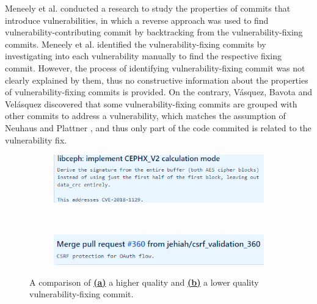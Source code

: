 \documentclass[12pt, a4paper]{report}
\begin{document}
Meneely et al. \cite{meneely_2013} conducted a research to study the properties of commits that
introduce vulnerabilities, in which a reverse approach was used to find vulnerability-contributing
commit by backtracking from the vulnerability-fixing commits. Meneely et al. identified the
vulnerability-fixing commits by investigating into each vulnerability manually to find the
respective fixing commit. However, the process of identifying vulnerability-fixing commit was not
clearly explained by them, thus no constructive information about the properties of
vulnerability-fixing commits is provided. On the contrary, V{\'a}squez, Bavota and Vel{\'a}squez
\cite{linares_2017} discovered that some vulnerability-fixing commits are grouped with other commits
to address a vulnerability, which matches the assumption of Neuhaus and Plattner
\cite{neuhaus_2013}, and thus only part of the code commited is related to the vulnerability fix.

\begin{figure}[H]
  \centering
  \begin{subfigure}{\textwidth}
    \centering
    \includegraphics[width=.7\textwidth]{images/vuln_fixing_commit_good_ex.png}
    \label{figure:g_vfc}
  \end{subfigure} \\
\end{figure}
\begin{figure}[H]\ContinuedFloat
  \begin{subfigure}{\textwidth}
    \centering
    \includegraphics[width=.7\textwidth]{images/vuln_fixing_commit_bad_ex.png}
    \label{figure:bad_vfc}
  \end{subfigure}
  \caption[Examples of vulnerability-fixing commit.]%
  {A comparison of \hyperref[figure:g_vfc]{\textbf{(a)}} a higher quality and
    \hyperref[figure:bad_vfc]{\textbf{(b)}} a lower quality vulnerability-fixing
    commit.}
  \label{figure:comparion_vfc}
\end{figure}
\end{document}
